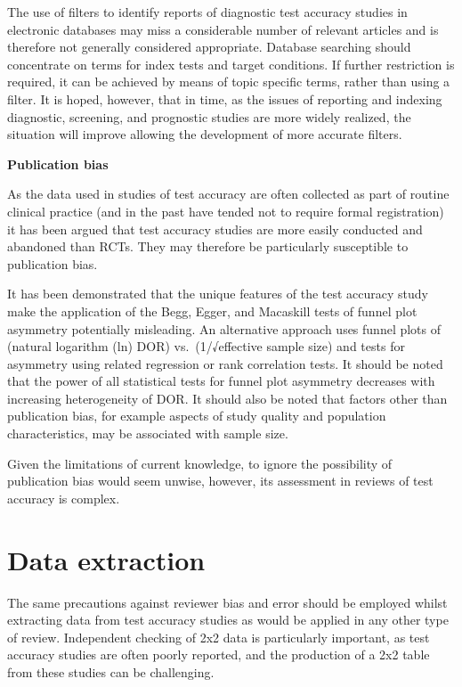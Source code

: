 \documentclass[
  11pt,
  a4paper,
  DIV=11,
  numbers=noendperiod]{scrreprt}
\begin{document}
The use of filters to identify reports of diagnostic test accuracy
studies in electronic databases may miss a considerable number of
relevant articles and is therefore not generally considered appropriate.
Database searching should concentrate on terms for index tests and
target conditions. If further restriction is required, it can be
achieved by means of topic specific terms, rather than using a filter.
It is hoped, however, that in time, as the issues of reporting and
indexing diagnostic, screening, and prognostic studies are more widely
realized, the situation will improve allowing the development of more
accurate filters.

\textbf{Publication bias}

As the data used in studies of test accuracy are often collected as part
of routine clinical practice (and in the past have tended not to require
formal registration) it has been argued that test accuracy studies are
more easily conducted and abandoned than RCTs. They may therefore be
particularly susceptible to publication bias.

It has been demonstrated that the unique features of the test accuracy
study make the application of the Begg, Egger, and Macaskill tests of
funnel plot asymmetry potentially misleading. An alternative approach
uses funnel plots of (natural logarithm (ln) DOR) vs.~(1/√effective
sample size) and tests for asymmetry using related regression or rank
correlation tests. It should be noted that the power of all statistical
tests for funnel plot asymmetry decreases with increasing heterogeneity
of DOR. It should also be noted that factors other than publication
bias, for example aspects of study quality and population
characteristics, may be associated with sample size.

Given the limitations of current knowledge, to ignore the possibility of
publication bias would seem unwise, however, its assessment in reviews
of test accuracy is complex.

\section{Data extraction}\label{data-extraction-1}

The same precautions against reviewer bias and error should be employed
whilst extracting data from test accuracy studies as would be applied in
any other type of review. Independent checking of 2x2 data is
particularly important, as test accuracy studies are often poorly
reported, and the production of a 2x2 table from these studies can be
challenging.
\end{document}
